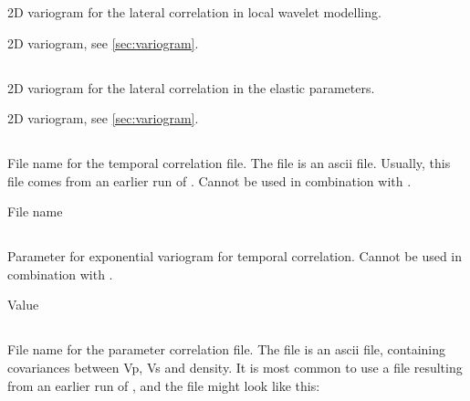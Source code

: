 \subsubsection{}
 \slist
   \item \Description 2D variogram for the lateral correlation in local wavelet  modelling.
   \item \Argument 2D variogram, see \autoref{sec:variogram}.
   \item \Default
 \elist

\subsection{}
 \slist
   \item \Description 2D variogram for the lateral correlation in the elastic parameters.
   \item \Argument 2D variogram, see \autoref{sec:variogram}.
   \item \Default
 \elist

\subsection{}
 \slist
   \item \Description File name for the temporal correlation file. The file is an ascii file. Usually, this file comes from an earlier run of \crava. Cannot be used in combination with .
   \item \Argument File name
   \item \Default
 \elist
 
 \subsection{}
  \slist
    \item \Description Parameter for exponential variogram for temporal correlation. Cannot be used in combination with .
    \item \Argument Value
    \item \Default
 \elist

\subsection{}
 \slist
   \item \Description File name for the parameter correlation file. The file is an ascii file, containing covariances between Vp, Vs and density.
   It is most common to use a file resulting from an earlier run of \crava, and the file might look like this:

